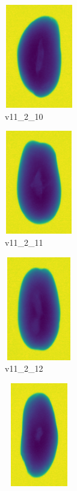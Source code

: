 \documentclass[11pt]{article}
\begin{document}
\begin{figure}
          \begin{subfigure}[b]{0.15\textwidth}
         \centering
         \includegraphics[width=3cm, height=4.5cm]{images/kartofler/v11_2_10_cut.png}
         \caption{v11\_2\_10}
         \label{fig:y equals x}
     \end{subfigure}
     \hfill
     \begin{subfigure}[b]{0.15\textwidth}
         \centering
         \includegraphics[width=3cm, height=4.5cm]{images/kartofler/v11_2_11_cut.png}
        \caption{v11\_2\_11}
         \label{fig:three sin x}
     \end{subfigure}
     \hfill
     \begin{subfigure}[b]{0.15\textwidth}
         \centering
         \includegraphics[width=3cm, height=4.5cm]{images/kartofler/v11_2_12_cut.png}
        \caption{v11\_2\_12}
         \label{fig:five over x}
     \end{subfigure}
     \hfill
    \begin{subfigure}[b]{0.15\textwidth}
         \centering
         \includegraphics[width=3cm, height=4.5cm]{images/kartofler/v11_2_13_cut.png}

\end{subfigure}
\end{figure}
\end{document}
